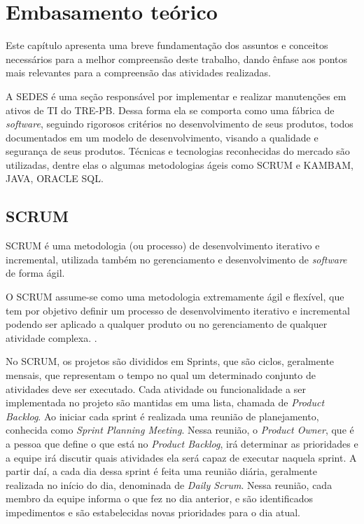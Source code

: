 
\chapter{Embasamento teórico }
\label{chap:embasamentoTeorico}

Este capítulo apresenta uma breve fundamentação dos assuntos e conceitos necessários para a melhor compreensão deste trabalho, dando ênfase aos pontos mais relevantes para a compreensão das atividades realizadas.

A SEDES é uma seção responsável por implementar e realizar manutenções em ativos de TI do TRE-PB. Dessa forma ela se comporta como uma fábrica de \textit{software}, seguindo rigorosos critérios no desenvolvimento de seus produtos, todos documentados em um modelo de desenvolvimento, visando a qualidade e segurança de seus produtos. Técnicas e tecnologias reconhecidas do mercado são utilizadas, dentre elas o algumas metodologias ágeis como SCRUM e KAMBAM, JAVA, ORACLE SQL.

\section{SCRUM}
\label{sec:embasamentoTeoricoSCRUM}

SCRUM é uma metodologia (ou processo) de desenvolvimento iterativo e incremental, utilizada também no gerenciamento e desenvolvimento de \textit{software} de forma ágil.

\begin{citacao}
    O SCRUM assume-se como uma metodologia extremamente ágil e flexível, que tem por objetivo definir um processo de desenvolvimento iterativo e incremental podendo ser aplicado a qualquer produto ou no gerenciamento de qualquer atividade complexa. \cite{Bissi2007}.
\end{citacao}

No SCRUM, os projetos são divididos em Sprints, que são ciclos, geralmente mensais, que representam o tempo no qual um determinado conjunto de atividades deve ser executado. Cada atividade ou funcionalidade a ser implementada no projeto são mantidas em uma lista, chamada de \textit{Product Backlog}. Ao iniciar cada sprint é realizada uma reunião de planejamento, conhecida como \textit{Sprint Planning Meeting}. Nessa reunião, o \textit{Product Owner}, que é a pessoa que define o que está no \textit{Product Backlog}, irá determinar as prioridades e a equipe irá discutir quais atividades ela será capaz de executar naquela sprint. A partir daí, a cada dia dessa sprint é feita uma reunião diária, geralmente realizada no início do dia, denominada de \textit{Daily Scrum}.  Nessa reunião, cada membro da equipe informa o que fez no dia anterior, e são identificados impedimentos e são estabelecidas novas prioridades para o dia atual.

